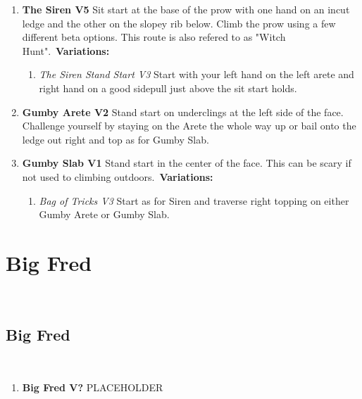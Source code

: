 \begin{enumerate}[resume]
	\item\label{rt:The Siren} \colorbox{RoyalBlue!20}{\textbf{The Siren V5     } }
	\newline Sit start at the base of the prow with one hand on an incut ledge and the other on the slopey rib below. Climb the prow using a few different beta options. This route is also refered to as "Witch Hunt".\
	\newline \textbf{Variations:}
	\begin{enumerate}
		\item\label{vr:The Siren Stand Start} \colorbox{green!20}{\emph{The Siren Stand Start V3    }  }
		\newline Start with your left hand on the left arete and right hand on a good sidepull just above the sit start holds.\
	\end{enumerate}
	\item\label{rt:Gumby Arete} \colorbox{green!20}{\textbf{Gumby Arete V2    } }
	\newline Stand start on underclings at the left side of the face. Challenge yourself by staying on the Arete the whole way up or bail onto the ledge out right and top as for Gumby Slab.\
	\item\label{rt:Gumby Slab} \colorbox{green!20}{\textbf{Gumby Slab V1   \ding{72}  } }
	\newline Stand start in the center of the face. This can be scary if not used to climbing outdoors.\
	\newline \textbf{Variations:}
	\begin{enumerate}
		\item\label{vr:Bag of Tricks} \colorbox{green!20}{\emph{Bag of Tricks V3 \ding{72}  }  }
		\newline Start as for Siren and traverse right topping on either Gumby Arete or Gumby Slab.\
	\end{enumerate}
\end{enumerate}
\section{Big Fred}\label{sa:Big Fred}
\
\subsection*{Big Fred}\label{bf:Big Fred}
\

\begin{enumerate}[]
	\item\label{rt:Big Fred} \colorbox{black!20}{\textbf{Big Fred V?  } }
	\newline PLACEHOLDER\
\end{enumerate}
